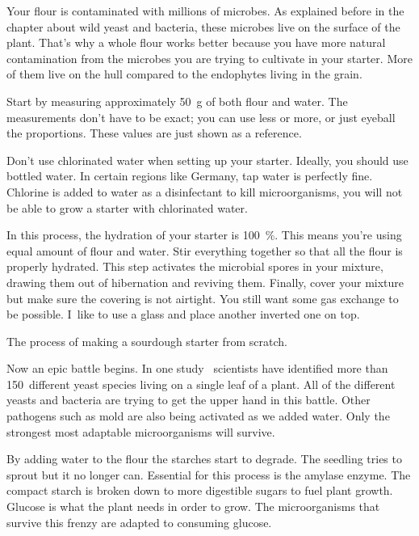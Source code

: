 Your flour is contaminated with millions of microbes. As explained
before in the chapter about wild yeast and bacteria, these
microbes live on the surface of the plant. That's why
a whole flour works better because you have more natural
contamination from the microbes you are trying to cultivate
in your starter. More of them live on the hull compared to the
endophytes living in the grain.

Start by measuring approximately \qty{50}{\gram} of both flour and
water. The measurements don't have to be exact; you can use
less or more, or just eyeball the proportions. These
values are just shown as a reference.

Don't use chlorinated water when setting up your starter.
Ideally, you should use bottled water. In certain regions
like Germany, tap water is perfectly fine. Chlorine is added
to water as a disinfectant to kill microorganisms, you will
not be able to grow a starter with chlorinated water.

In this process, the hydration of your starter is \qty{100}{\percent}.
This means you're using equal amount of flour and
water. Stir everything together so that all the flour is
properly hydrated. This step activates the microbial spores
in your mixture, drawing them out of hibernation and
reviving them.
Finally, cover your mixture but make sure the covering is
not airtight. You still want some gas exchange to be possible.
I~like to use a glass and place another
inverted one on top.

\begin{flowchart}[!htb]
\centering
  
  \caption[The full sourdough starter process]{The process of making a sourdough
      starter from scratch.}%
  \label{fig:sourdough-starter-process}
\end{flowchart}

Now an epic battle begins. In one study~\cite{yeasts+biocontrol+agent}
scientists have identified more than \num{150}~different yeast species living
on a single leaf of a plant.
All of the different yeasts and bacteria are trying to get
the upper hand in this battle. Other pathogens such as mold
are also being activated as we added water. Only the strongest
most adaptable microorganisms will survive.

By adding water to the
flour the starches start to degrade. The seedling tries to
sprout but it no longer can. Essential for this process is the
amylase enzyme. The compact starch is broken down to more
digestible sugars to fuel plant growth. Glucose is what the
plant needs in order to grow. The microorganisms that survive
this frenzy are adapted to consuming glucose. 

